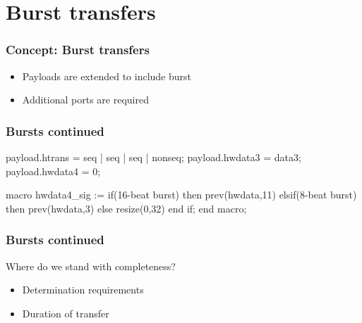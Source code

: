 \documentclass[]{beamer}
\begin{document}
\section{Burst transfers}
 \begin{frame}
  \frametitle{Concept: Burst transfers}
    \begin{itemize}
      \item<1-> Payloads are extended to include burst
      \item<2-> Additional ports are required 
    \end{itemize}  
 \end{frame}

 \begin{frame}[fragile]
   \frametitle{Bursts continued}
 
  \begin{VHI}
payload.htrans = seq | seq | seq | nonseq;
payload.hwdata3 = data3;
payload.hwdata4 = 0;

macro hwdata4_sig := 
if(16-beat burst) then
prev(hwdata,11)
elsif(8-beat burst) then
prev(hwdata,3)
else
resize(0,32)
end if;
end macro;
  \end{VHI}
 \end{frame}

\begin{frame}
 \frametitle{Bursts continued}
 Where do we stand with completeness?
 \begin{itemize}
  \item<1-> Determination requirements
  \item<2-> Duration of transfer
 \end{itemize}
\end{frame}
\end{document}
